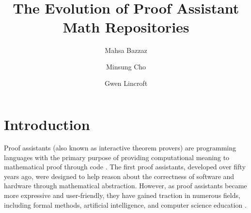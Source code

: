 \documentclass[sigconf,nonacm]{acmart}
\begin{document}
\title{The Evolution of Proof Assistant Math Repositories}


\author{Mahsa Bazzaz}

\author{Minsung Cho}

\author{Gwen Lincroft}

\renewcommand{\shortauthors}{Bazzaz, Cho, and Lincroft}

\maketitle

\section{Introduction}

Proof assistants (also known as interactive theorem provers) are programming languages with the primary purpose of providing computational meaning to mathematical proof through code \cite{de2015lean}. The first proof assistants, developed over fifty years ago, were designed to help reason about the correctness of software and hardware through mathematical abstraction. However, as proof assistants became more expressive and user-friendly, they have gained traction in numerous fields, including formal methods, artificial intelligence, and computer science education \cite{green1981application,hunt1994fm8501,knobelsdorf2017theorem}.
\end{document}
